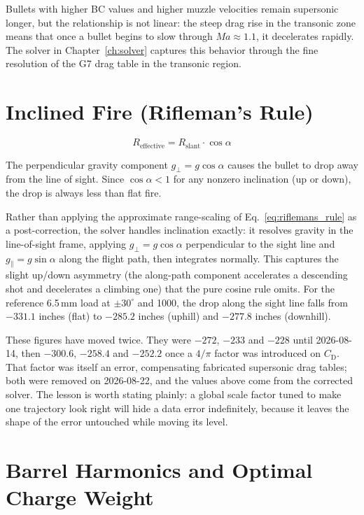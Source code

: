 \documentclass[11pt,twoside,openright]{report}
\newcommand{\Cd}{C_{\mathrm{D}}}
\newcommand{\Mach}{\mathit{Ma}}
\begin{document}
Bullets with higher BC values and higher muzzle velocities remain supersonic longer, but the relationship is not linear: the steep drag rise in the transonic zone means that once a bullet begins to slow through $\Mach \approx 1.1$, it decelerates rapidly. The solver in Chapter~\ref{ch:solver} captures this behavior through the fine resolution of the G7 drag table in the transonic region.

\section{Inclined Fire (Rifleman's Rule)}

\begin{equation}
  R_{\mathrm{effective}} = R_{\mathrm{slant}} \cdot \cos\alpha
  \label{eq:riflemans_rule}
\end{equation}

The perpendicular gravity component $g_{\perp} = g\cos\alpha$ causes the bullet to drop away from the line of sight. Since $\cos\alpha < 1$ for any nonzero inclination (up or down), the drop is always less than flat fire.

Rather than applying the approximate range-scaling of Eq.~\eqref{eq:riflemans_rule}
as a post-correction, the solver handles inclination exactly: it resolves gravity
in the line-of-sight frame, applying $g_{\perp} = g\cos\alpha$ perpendicular to the
sight line and $g_{\parallel} = g\sin\alpha$ along the flight path, then integrates
normally. This captures the slight up/down asymmetry (the along-path component
accelerates a descending shot and decelerates a climbing one) that the pure
cosine rule omits. For the reference 6.5\,mm load at $\pm 30^{\circ}$ and
\SI{1000}{\yard}, the drop along the sight line falls from $-331.1$ inches (flat) to
$-285.2$ inches (uphill) and $-277.8$ inches (downhill).

These figures have moved twice. They were $-272$, $-233$ and $-228$ until 2026-08-14,
then $-300.6$, $-258.4$ and $-252.2$ once a $4/\pi$ factor was introduced on $\Cd$.
That factor was itself an error, compensating fabricated supersonic drag tables; both
were removed on 2026-08-22, and the values above come from the corrected solver. The
lesson is worth stating plainly: a global scale factor tuned to make one trajectory
look right will hide a data error indefinitely, because it leaves the shape of the
error untouched while moving its level.

\section{Barrel Harmonics and Optimal Charge Weight}
\end{document}
